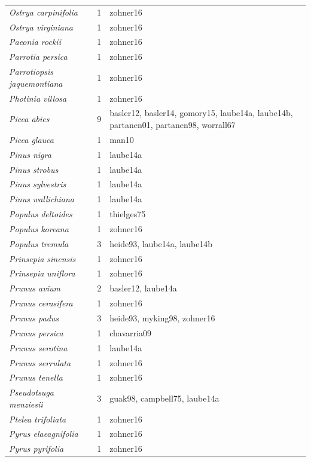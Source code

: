 \documentclass{article}
\begin{document}
\begin{footnotesize}
\begin{longtable}{p{}p{}p{}}
  \textit{Ostrya carpinifolia} &   1 & zohner16 \\ 
  \textit{Ostrya virginiana} &   1 & zohner16 \\ 
  \textit{Paeonia rockii} &   1 & zohner16 \\ 
  \textit{Parrotia persica} &   1 & zohner16 \\ 
  \textit{Parrotiopsis jaquemontiana} &   1 & zohner16 \\ 
  \textit{Photinia villosa} &   1 & zohner16 \\ 
  \textit{Picea abies} &   9 & basler12, basler14, gomory15, laube14a, laube14b, partanen01, partanen98, worrall67 \\ 
  \textit{Picea glauca} &   1 & man10 \\ 
  \textit{Pinus nigra} &   1 & laube14a \\ 
  \textit{Pinus strobus} &   1 & laube14a \\ 
  \textit{Pinus sylvestris} &   1 & laube14a \\ 
  \textit{Pinus wallichiana} &   1 & laube14a \\ 
  \textit{Populus deltoides} &   1 & thielges75 \\ 
  \textit{Populus koreana} &   1 & zohner16 \\ 
  \textit{Populus tremula} &   3 & heide93, laube14a, laube14b \\ 
  \textit{Prinsepia sinensis} &   1 & zohner16 \\ 
  \textit{Prinsepia uniflora} &   1 & zohner16 \\ 
  \textit{Prunus avium} &   2 & basler12, laube14a \\ 
  \textit{Prunus cerasifera} &   1 & zohner16 \\ 
  \textit{Prunus padus} &   3 & heide93, myking98, zohner16 \\ 
  \textit{Prunus persica} &   1 & chavarria09 \\ 
  \textit{Prunus serotina} &   1 & laube14a \\ 
  \textit{Prunus serrulata} &   1 & zohner16 \\ 
  \textit{Prunus tenella} &   1 & zohner16 \\ 
  \textit{Pseudotsuga menziesii} &   3 & guak98, campbell75, laube14a \\ 
  \textit{Ptelea trifoliata} &   1 & zohner16 \\ 
  \textit{Pyrus elaeagnifolia} &   1 & zohner16 \\ 
  \textit{Pyrus pyrifolia} &   1 & zohner16 \\ 

\end{longtable}
\end{footnotesize}
\end{document}
